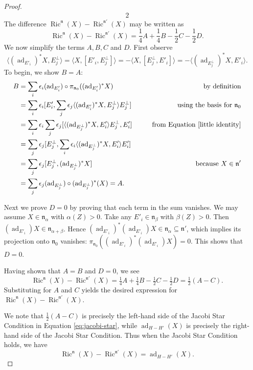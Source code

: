 \documentclass[12pt]{amsart}
\newcommand{\smallfrac}[2]{\textstyle{\frac{#1}{#2}}  }
\newcommand{\frakn}{\ensuremath{\mathfrak{n}} }
\newcommand\n{{\mathfrak{n}}}
\newcommand\ad{\operatorname{ad}}
\newcommand{\Ric}{\operatorname{Ric}}
\theoremstyle{plain}
\theoremstyle{definition}
\theoremstyle{remark}
\numberwithin{equation}{section}
\numberwithin{theorem}{section}
\begin{document}
\begin{proof}
\begin{alignat}{2}
\end{alignat}
The difference  $\Ric^{\n} (X) - \Ric^{\n'} (X) $ may  be written as 
\[ \Ric^{\n} (X) - \Ric^{\n'} (X)  = \smallfrac 14 A + \smallfrac 14  B - \smallfrac 12 C -\smallfrac 12 D. \]
We now simplify the terms $A, B, C$ and  $D$.  
First observe  
\begin{equation}\label{little identity} \langle (\ad_{E'_i})^*X, E_j^\perp \rangle = \langle X, [E'_i,
E_j^\perp] \rangle = -\langle X, [E_j^\perp , E'_i] \rangle = -\langle
(\ad_{E_j^\perp})^* X, E'_i \rangle.\end{equation}  
To begin, we show $B = A$: 
\begin{alignat*}{2}
 B &= \sum_i \epsilon_i  (\ad_{E'_i}) \circ \pi_{\n_0} ((\ad_{E'_i})^* X) \qquad &
  \text{by definition}\\ 
& = 
\sum_i\epsilon_i  [ E'_i, \sum_j \epsilon_j \langle (\ad_{E'_i})^* X, E_j^\perp \rangle
E_j^\perp] \qquad &  \strut \text{using the basis for $\frakn_0$}  \\
&=  \sum_i \epsilon_i  \sum_j \epsilon_j [ \langle (\ad_{E_j^\perp})^* X, E'_i \rangle
E_j^\perp, E'_i ] 
& \text{from Equation \eqref{little identity}}\\
&= \sum_j \epsilon_j [ E_j^\perp , \sum_i \epsilon_i \langle (\ad_{E_j^\perp})^* X,
E'_i\rangle E'_i]  &  \\
& = \sum_j \epsilon_j [E_j^\perp, (\ad_{E_j^\perp})^* X] & 
\text{because $X \in \frakn'$}\\ 
&= \sum_j \epsilon_j  (\ad_{E_j^\perp}) \circ  (\ad_{E_j^\perp})^* (X) 
= A. & \end{alignat*}

Next we prove $D=0$ by proving that each term in the sum vanishes.
We may assume $X \in \n_{\alpha}$ with $\alpha(Z) > 0$.  Take any $E'_i \in \n_{\beta}$ with $\beta(Z) > 0$. Then  $(\ad_{E'_i}) X \in \n_{\alpha + \beta}$. Hence $(\ad_{E'_i})^* (\ad_{E'_i}) X \in
\n_{\alpha} \subseteq \n'$, which implies its projection onto $\n_0$ vanishes: $\pi_{\n_0}((\ad_{E'_i})^* (\ad_{E'_i}) X) =0$. This shows that $D=0$.

Having shown that $A=B$ and $D=0$,  we see 
\[ \Ric^{\n} (X) - \Ric^{\n'} (X)  = \tfrac 14 A + \tfrac 14  B - \tfrac 12 C -\tfrac 12 D  = \tfrac 12 (A -  C).
\]
Substituting for $A$ and $C$ yields  the desired expression for $\Ric^{\n} (X) - \Ric^{\n'} (X) $.

We note that $\tfrac 12 (A -  C)$ is precisely the left-hand side of the Jacobi Star Condition in Equation \eqref{eq:jacobi-star}, while $\ad_{H-H'}(X)$ is precisely the right-hand side of the Jacobi Star Condition. Thus when the Jacobi Star Condition holds, we have
\[ \Ric^{\n} (X) - \Ric^{\n'} (X)  =  \ad_{H-H'}(X). 
\]
\end{proof}
\end{document}
